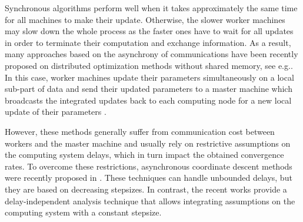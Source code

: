 
Synchronous algorithms perform well when it takes approximately the same time for all machines to make their update. Otherwise, the slower worker machines may slow down the whole process as the faster ones have to wait for all updates in order to terminate their computation and exchange information. As a result, many approaches based on the asynchrony of communications have been recently proposed on distributed optimization methods without shared memory, see e.g.\;\cite{zhang2014asynchronous,ma2015adding,aytekin2016analysis,peng2016arock,calauzenes2017distributed}. In this case, worker machines update their parameters simultaneously on a local sub-part of data and send their updated parameters to a master machine which broadcasts the integrated updates back to each computing node for a new local update of their parameters \cite{li2013distributed,konevcny2016federated,ICML18}.


However, these methods generally suffer from communication cost between workers and the master machine and usually rely on restrictive assumptions on the computing system delays, which in turn impact the obtained convergence rates. To overcome these restrictions, asynchronous coordinate descent methods were recently proposed in \cite{hannah2016unbounded,sun2017asynchronous}. These techniques can handle unbounded delays, but they are based on decreasing stepsizes. In contrast, the recent works \cite{ICML18,mishchenko2018} provide a delay-independent analysis technique that allows integrating assumptions on the computing system with a constant stepsize.


